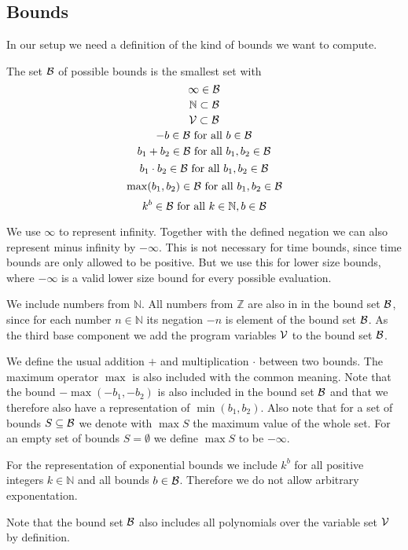 \subsection{Bounds}

In our setup we need a definition of the kind of bounds we want to compute.

\begin{definition}
  The set $\mathcal{B}$ of possible bounds is the smallest set with
  \[ \infty \in \mathcal{B} \]
  \[ \mathbb{N} \subset \mathcal{B} \] 
  \[ \mathcal{V} \subset \mathcal{B} \] 
  \[ -b \in \mathcal{B} \text{ for all } b \in \mathcal{B} \] 
  \[ b_1 + b_2 \in \mathcal{B} \text{ for all } b_1, b_2 \in \mathcal{B} \] 
  \[ b_1 \cdot b_2 \in \mathcal{B} \text{ for all } b_1, b_2 \in \mathcal{B} \] 
  \[ \max(b_1, b_2) \in \mathcal{B} \text{ for all } b_1, b_2 \in \mathcal{B} \]
  \[ k^b \in \mathcal{B} \text{ for all } k \in \mathbb{N}, b \in \mathcal{B} \]
\end{definition}

We use $\infty$ to represent infinity.
Together with the defined negation we can also represent minus infinity by $-\infty$.
This is not necessary for time bounds, since time bounds are only allowed to be positive.
But we use this for lower size bounds, where $-\infty$ is a valid lower size bound for every possible evaluation.

We include numbers from $\mathbb{N}$.
All numbers from $\mathbb{Z}$ are also in in the bound set $\mathcal{B}$, since for each number $n \in \mathbb{N}$ its negation $-n$ is element of the bound set $\mathcal{B}$.
As the third base component we add the program variables $\mathcal{V}$ to the bound set $\mathcal{B}$.

We define the usual addition $+$ and multiplication $\cdot$ between two bounds.
The maximum operator $\max$ is also included with the common meaning.
Note that the bound $-\max(-b_1,-b_2)$ is also included in the bound set $\mathcal{B}$ and that we therefore also have a representation of $\min(b_1,b_2)$.
Also note that for a set of bounds $S \subseteq \mathcal{B}$ we denote with $\max S$ the maximum value of the whole set.
For an empty set of bounds $S = \emptyset$ we define $\max S$ to be $-\infty$.

For the representation of exponential bounds we include $k^b$ for all positive integers $k \in \mathbb{N}$ and all bounds $b \in \mathcal{B}$.
Therefore we do not allow arbitrary exponentation.

Note that the bound set $\mathcal{B}$ also includes all polynomials over the variable set $\mathcal{V}$ by definition.

